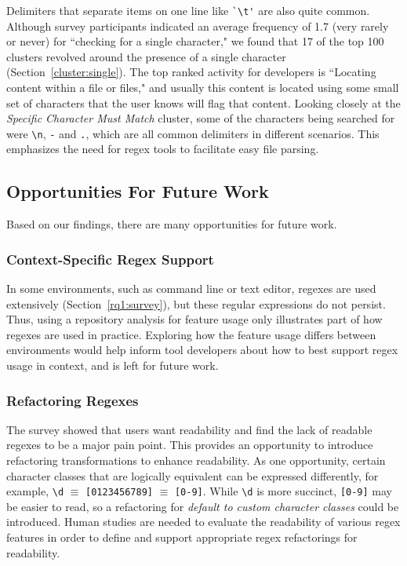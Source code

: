 Delimiters that separate items on one line like \verb!`\t'! are also quite common.  Although survey participants indicated an average frequency of 1.7 (very rarely or never) for ``checking for a single character," we found that 17 of the top 100 clusters revolved around the presence of a single character (Section~\ref{cluster:single}).
The top ranked activity for developers is ``Locating content within a file or files," and usually this content is located using some small set of characters that the user knows will flag that content.  Looking closely at the \emph{Specific Character Must Match} cluster, some of the characters being searched for were \verb!\n!, \verb!-! and \verb!.!, which are all common delimiters in different scenarios. This emphasizes the need for regex tools to  facilitate easy file parsing.



\subsection{Opportunities For Future Work}

Based on our findings, there are many opportunities for future work.



\subsubsection{Context-Specific Regex Support}
In some environments, such as command line or text editor, regexes are used extensively (Section~\ref{rq1:survey}), but these regular expressions do not persist. Thus, using a repository analysis for feature usage only illustrates part of how regexes are used in practice. Exploring how the feature usage differs between environments would help inform tool developers about how to best support regex usage in context, and is left for future work.

\subsubsection{Refactoring Regexes}
The survey showed that users want readability and find the lack of readable regexes to be a major pain point.
This provides an opportunity to introduce refactoring transformations to enhance readability.
As one opportunity, certain character classes that are logically equivalent can be expressed differently, for example, \verb!\d! $\equiv$ \verb![0123456789]! $\equiv$ \verb![0-9]!. While \verb!\d! is more succinct, \verb![0-9]! may be easier to read, so a refactoring for \emph{default to custom character classes} could be introduced.
Human studies are needed to evaluate the readability of various regex features in order to define and support appropriate regex refactorings for readability.

